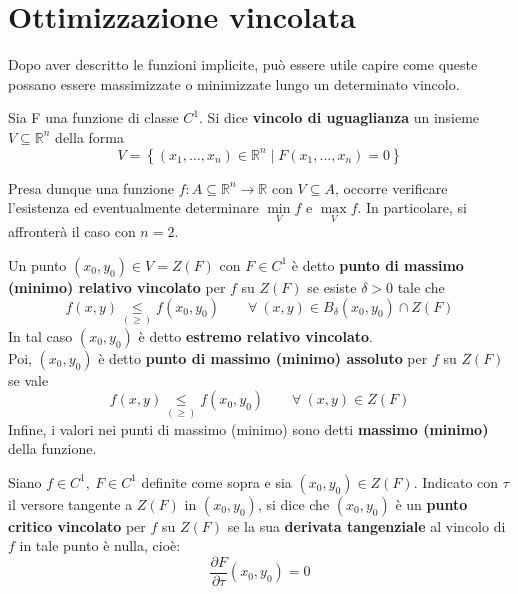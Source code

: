 \section{Ottimizzazione vincolata}
Dopo aver descritto le funzioni implicite, può essere utile capire come queste possano essere massimizzate o minimizzate lungo un determinato vincolo.
\begin{definition} \label{Def: Vincolo di uguaglianza}
Sia F una funzione di classe $C^1$. Si dice \textbf{vincolo di uguaglianza} un insieme $V \subseteq \mathbb{R}^n$ della forma
\begin{equation}
    V= \left\{(x_1, \dots, x_n) \in \mathbb{R}^n \mid F(x_1, \dots, x_n)=0 \right\}
\end{equation}
\end{definition}
Presa dunque una funzione $f:A\subseteq \mathbb{R}^n \to \mathbb{R}$ con $V \subseteq A$, occorre verificare l'esistenza ed eventualmente determinare $\min\limits_{V}{f}$ e $\max\limits_{V}{f}$.
In particolare, si affronterà il caso con $n=2$.
\begin{definition} \label{Def: Estremi vincolati}
    Un punto $(x_0, y_0) \in V= Z(F)$ con $F \in C^1$ è detto \textbf{punto di massimo (minimo) relativo vincolato} per $f$ su $Z(F)$ se esiste $\delta>0$ tale che 
    \begin{equation}
        f(x,y) \underset{(\geq)}{\leq} f(x_0, y_0) \qquad \forall\ (x, y) \in B_\delta(x_0, y_0) \cap Z(F)
    \end{equation}
    In tal caso $(x_0, y_0)$ è detto \textbf{estremo relativo vincolato}.\\
    Poi, $(x_0, y_0)$ è detto \textbf{punto di massimo (minimo) assoluto} per $f$ su $Z(F)$ se vale
    \begin{equation}
        f(x, y) \underset{(\geq)}{\leq} f(x_0, y_0) \qquad \forall\ (x, y) \in Z(F)
    \end{equation}
    Infine, i valori nei punti di massimo (minimo) sono detti \textbf{massimo (minimo)} della funzione.
\end{definition}
\begin{definition} \label{Punto critico vincolato}
    Siano $f \in C^1,\ F \in C^1$ definite come sopra e sia $(x_0, y_0) \in Z(F)$. Indicato con $\tau$ il versore tangente a $Z(F)$ in $(x_0, y_0)$, si dice che $(x_0, y_0)$ è un \textbf{punto critico vincolato} per $f$ su $Z(F)$ se la sua \textbf{derivata tangenziale} al vincolo di $f$ in tale punto è nulla, cioè:
    \begin{equation} \label{Eq: Derivata tangenziale}
        \frac{\partial{F}}{\partial \tau}(x_0, y_0)=0 
    \end{equation}
\end{definition}
